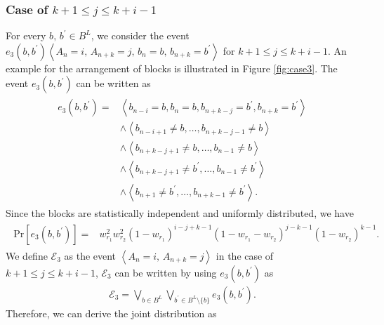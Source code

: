 \documentclass[dvipdfmx,english]{ampmt} %
\begin{document}
\subsubsection{Case of $k+1 \leq j \leq k+i-1$}%
For every $b,\, b^\prime \in B^L$, we consider the event $e_3(b,b^\prime) \left< A_n=i ,\, A_{n+k}=j,\,b_n=b,\,b_{n+k}=b^\prime\right>$ for $k+1 \leq j \leq k+i-1$. 
An example for the arrangement of blocks is illustrated in Figure \ref{fig:case3}.
The event $e_3(b,b^\prime)$ can be written as
\begin{align}
\begin{split}
  \label{eq:e_3}
  e_3 \left(b,b^\prime\right) = 
  &\left< b_{n-i} = b , b_{n} = b , b_{n+k-j} = b^\prime , b_{n+k} = b^\prime \right> \\
  &\land \left< b_{n-i+1} \neq b, \dots, b_{n+k-j-1} \neq b \right> \\
  &\land \left< b_{n+k-j+1} \neq b, \dots, b_{n-1} \neq b \right> \\
  &\land \left< b_{n+k-j+1} \neq b^\prime, \dots, b_{n-1} \neq b^\prime \right> \\
  &\land \left< b_{n+1} \neq b^\prime , \dots, b_{n+k-1} \neq b^\prime \right>.
\end{split}
\end{align}
Since the blocks are statistically independent and uniformly distributed, we have
\begin{align}
\begin{split}
  \label{eq:probability_e3}
  \mathrm{Pr} \left[ e_3 \left(b,b^\prime\right) \right] 
  =& w_{r_1}^2 w_{r_2}^2 
  (1-w_{r_1})^{i-j+k-1} 
  (1-w_{r_1}-w_{r_2})^{j-k-1}
  (1-w_{r_2})^{k-1}.
\end{split}
\end{align}
We define $\mathcal{E}_3$ as the event $\left< A_n=i ,\, A_{n+k}=j \right>$ in the case of $k+1 \leq j \leq k+i-1$, $\mathcal{E}_3$ can be written by using $e_3(b,b^\prime)$ as
\begin{align}\label{eq:E_3}
  \mathcal{E}_3 = \bigvee_{b \in B^L} \bigvee_{b^\prime \in B^L \setminus \{b\}} e_3 \left(b,b^\prime\right).
\end{align}
Therefore, we can derive the joint distribution as
\end{document}
